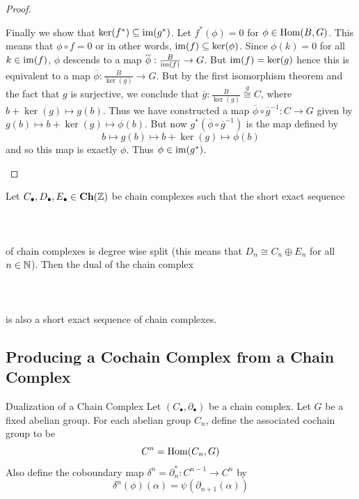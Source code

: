 \documentclass[a4paper]{article}
\begin{document}
\begin{prp}{}{}
\begin{proof}
\begin{itemize}
Finally we show that $\ker(f^\ast)\subseteq\operatorname{im}(g^\ast)$. Let $f^\ast(\phi)=0$ for $\phi\in\operatorname{Hom}(B,G)$. This means that $\phi\circ f=0$ or in other words, $\operatorname{im}(f)\subseteq\ker(\phi)$.
Since $\phi(k)=0$ for all $k\in\operatorname{im}(f)$, $\phi$ descends to a map $\overline{\phi}:\frac{B}{\operatorname{im}(f)}\to G$. But $\operatorname{im}(f)=\ker(g)$ hence this is equivalent to a map $\overline{\phi}:\frac{B}{\ker(g)}\to G$. But by the first isomorphism theorem and the fact that $g$ is surjective, we conclude that $\overline{g}:\frac{B}{\ker(g)}\overset{g}{\cong} C$, where $b+\ker(g)\mapsto g(b)$. Thus we have constructed a map $\overline{\phi}\circ\overline{g}^{-1}:C\to G$ given by $g(b)\mapsto b+\ker(g)\mapsto\phi(b)$. But now $g^\ast(\overline{\phi}\circ\overline{g}^{-1})$ is the map defined by $$b\mapsto g(b)\mapsto b+\ker(g)\mapsto\phi(b)$$ and so this map is exactly $\phi$. Thus $\phi\in\operatorname{im}(g^\ast)$. 
\end{itemize}
\end{proof}
\end{prp}

\begin{prp}{}{} Let $C_\bullet,D_\bullet,E_\bullet\in\bold{Ch}(\mathbb{Z})$ be chain complexes such that the short exact sequence \\~\\
\\~\\
of chain complexes is degree wise split (this means that $D_n\cong C_n\oplus E_n$ for all $n\in\mathbb{N}$). Then the dual of the chain complex \\~\\
\\~\\
is also a short exact sequence of chain complexes. 
\end{prp}

\subsection{Producing a Cochain Complex from a Chain Complex}
\begin{defn}{Dualization of a Chain Complex}{} Let $(C_\bullet,\partial_\bullet)$ be a chain complex. Let $G$ be a fixed abelian group. For each abelian group $C_n$, define the associated cochain group to be $$C^n=\operatorname{Hom}(C_n,G)$$ Also define the coboundary map $\delta^n=\partial_n^\ast:C^{n-1}\to C^n$ by $$\delta^n(\phi)(\alpha)=\psi(\partial_{n+1}(\alpha))$$
\end{defn}
\end{document}
